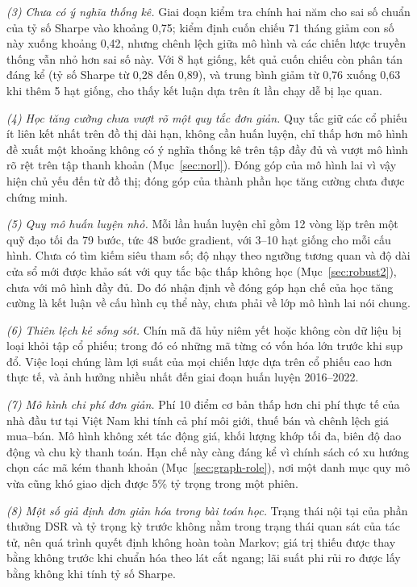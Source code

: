 \textit{(3) Chưa có ý nghĩa thống kê.} Giai đoạn kiểm tra chính hai năm cho sai số chuẩn của tỷ số Sharpe vào khoảng 0,75; kiểm định cuốn chiếu 71 tháng giảm con số này xuống khoảng 0,42, nhưng chênh lệch giữa mô hình và các chiến lược truyền thống vẫn nhỏ hơn sai số này. Với 8 hạt giống, kết quả cuốn chiếu còn phân tán đáng kể (tỷ số Sharpe từ 0,28 đến 0,89), và trung bình giảm từ 0,76 xuống 0,63 khi thêm 5 hạt giống, cho thấy kết luận dựa trên ít lần chạy dễ bị lạc quan.

\textit{(4) Học tăng cường chưa vượt rõ một quy tắc đơn giản.} Quy tắc giữ các cổ phiếu ít liên kết nhất trên đồ thị dài hạn, không cần huấn luyện, chỉ thấp hơn mô hình đề xuất một khoảng không có ý nghĩa thống kê trên tập đầy đủ và vượt mô hình rõ rệt trên tập thanh khoản (Mục~\ref{sec:norl}). Đóng góp của mô hình lai vì vậy hiện chủ yếu đến từ đồ thị; đóng góp của thành phần học tăng cường chưa được chứng minh.

\textit{(5) Quy mô huấn luyện nhỏ.} Mỗi lần huấn luyện chỉ gồm 12 vòng lặp trên một quỹ đạo tối đa 79 bước, tức 48 bước gradient, với 3--10 hạt giống cho mỗi cấu hình. Chưa có tìm kiếm siêu tham số; độ nhạy theo ngưỡng tương quan và độ dài cửa sổ mới được khảo sát với quy tắc bậc thấp không học (Mục~\ref{sec:robust2}), chưa với mô hình đầy đủ. Do đó nhận định về đóng góp hạn chế của học tăng cường là kết luận về cấu hình cụ thể này, chưa phải về lớp mô hình lai nói chung.

\textit{(6) Thiên lệch kẻ sống sót.} Chín mã đã hủy niêm yết hoặc không còn dữ liệu bị loại khỏi tập cổ phiếu; trong đó có những mã từng có vốn hóa lớn trước khi sụp đổ. Việc loại chúng làm lợi suất của mọi chiến lược dựa trên cổ phiếu cao hơn thực tế, và ảnh hưởng nhiều nhất đến giai đoạn huấn luyện 2016--2022.

\textit{(7) Mô hình chi phí đơn giản.} Phí 10 điểm cơ bản thấp hơn chi phí thực tế của nhà đầu tư tại Việt Nam khi tính cả phí môi giới, thuế bán và chênh lệch giá mua--bán. Mô hình không xét tác động giá, khối lượng khớp tối đa, biên độ dao động và chu kỳ thanh toán. Hạn chế này càng đáng kể vì chính sách có xu hướng chọn các mã kém thanh khoản (Mục~\ref{sec:graph-role}), nơi một danh mục quy mô vừa cũng khó giao dịch được 5\% tỷ trọng trong một phiên.

\textit{(8) Một số giả định đơn giản hóa trong bài toán học.} Trạng thái nội tại của phần thưởng DSR và tỷ trọng kỳ trước không nằm trong trạng thái quan sát của tác tử, nên quá trình quyết định không hoàn toàn Markov; giá trị thiếu được thay bằng không trước khi chuẩn hóa theo lát cắt ngang; lãi suất phi rủi ro được lấy bằng không khi tính tỷ số Sharpe.

